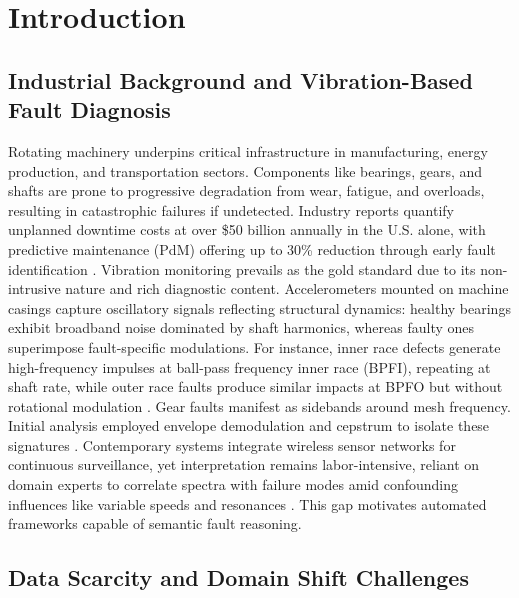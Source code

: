 \section{Introduction}

\subsection{Industrial Background and Vibration-Based Fault Diagnosis}

Rotating machinery underpins critical infrastructure in manufacturing, energy production, and transportation sectors. Components like bearings, gears, and shafts are prone to progressive degradation from wear, fatigue, and overloads, resulting in catastrophic failures if undetected. Industry reports quantify unplanned downtime costs at over \$50 billion annually in the U.S. alone, with predictive maintenance (PdM) offering up to 30\% reduction through early fault identification \cite{cite1}. Vibration monitoring prevails as the gold standard due to its non-intrusive nature and rich diagnostic content. Accelerometers mounted on machine casings capture oscillatory signals reflecting structural dynamics: healthy bearings exhibit broadband noise dominated by shaft harmonics, whereas faulty ones superimpose fault-specific modulations. For instance, inner race defects generate high-frequency impulses at ball-pass frequency inner race (BPFI), repeating at shaft rate, while outer race faults produce similar impacts at BPFO but without rotational modulation \cite{cite2}. Gear faults manifest as sidebands around mesh frequency. Initial analysis employed envelope demodulation and cepstrum to isolate these signatures \cite{cite3}. Contemporary systems integrate wireless sensor networks for continuous surveillance, yet interpretation remains labor-intensive, reliant on domain experts to correlate spectra with failure modes amid confounding influences like variable speeds and resonances \cite{cite4}. This gap motivates automated frameworks capable of semantic fault reasoning.

\subsection{Data Scarcity and Domain Shift Challenges}

